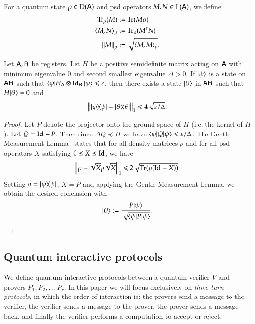 For a quantum state $\rho \in \mathrm{D}({\mathsf{A}})$ and psd operators $M,N \in \mathrm{L}({\mathsf{A}})$, we define 
\begin{align}
	\operatorname{Tr}_\rho(M) &:= \operatorname{Tr}(M \rho) \\
	\langle M, N \rangle_\rho &:= \operatorname{Tr}_\rho (M^\dagger N) \\
	\left\lVert M \right\rVert_\rho & := \sqrt{ \langle M, M \rangle_\rho}.
\end{align}

\begin{lemma}
\label{lem:closeness_to_groundspace}
	Let ${\mathsf{A}}, {\mathsf{R}}$ be registers. Let $H$ be a positive semidefinite matrix acting on ${\mathsf{A}}$ with minimum eigenvalue $0$ and second smallest eigenvalue $\Delta > 0$. If $|\psi\rangle$ is a state on ${\mathsf{A}} {\mathsf{R}}$ such that $\langle\psi| H_{{\mathsf{A}}} \otimes \mathop{\mathrm{Id}}\!\mathinner{}_{{\mathsf{R}}} |\psi\rangle \leqslant \varepsilon$, then there exists a state $|\theta\rangle$ in ${\mathsf{A}} {\mathsf{R}}$ such that $H |\theta\rangle = 0$ and
	\[
		\left \| |\psi\rangle\! \langle \psi| - |\theta\rangle\! \langle \theta| \right \|_1 \leqslant 4\sqrt{\varepsilon/\Delta}.
	\]
\end{lemma}
\begin{proof}
	Let $P$ denote the projector onto the ground space of $H$ (i.e. the kernel of $H$). Let $Q = \mathop{\mathrm{Id}}\!\mathinner{} - P$. Then since $\Delta Q \preceq H$ we have $\langle\psi| Q |\psi\rangle \leqslant \varepsilon/\Delta$. The Gentle Measurement Lemma~\cite{ogawa2002new} states that for all density matrices $\rho$ and for all psd operators $X$ satisfying $0 \preceq X \preceq \mathop{\mathrm{Id}}\!\mathinner{}$, we have
	\[
		\left \| \rho - \sqrt{X}\rho \sqrt{X}  \right \|_1 \leqslant 2 \sqrt{ \operatorname{Tr}(\rho (\mathop{\mathrm{Id}}\!\mathinner{} - X))}.
	\]
	Setting $\rho = |\psi\rangle\! \langle \psi|$, $X = P$ and applying the Gentle Measurement Lemma, we obtain the desired conclusion with
	\[
		|\theta\rangle := \frac{ P |\psi\rangle}{\sqrt{ \langle\psi| P |\psi\rangle}}.
	\]
\end{proof}

\subsection{Quantum interactive protocols} 

We define quantum interactive protocols between a quantum verifier $V$ and provers $P_1,P_2,\ldots,P_r$. In this paper we will focus exclusively on \emph{three-turn protocols}, in which the order of interaction is: the provers send a message to the verifier, the verifier sends a message to the prover, the prover sends a message back, and finally the verifier performs a computation to accept or reject. 


